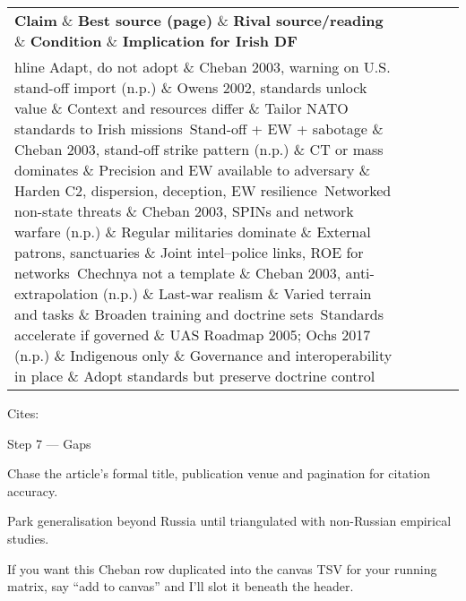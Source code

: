 \begin{tabular}{p{3.2cm}p{4.2cm}p{3.6cm}p{3.2cm}p{4.2cm}}
	\textbf{Claim} \& \textbf{Best source (page)} \& \textbf{Rival source/reading} \& \textbf{Condition} \& \textbf{Implication for Irish DF}\\hline
	Adapt, do not adopt \& Cheban 2003, warning on U.S. stand-off import (n.p.) \& Owens 2002, standards unlock value \& Context and resources differ \& Tailor NATO standards to Irish missions\
	Stand-off + EW + sabotage \& Cheban 2003, stand-off strike pattern (n.p.) \& CT or mass dominates \& Precision and EW available to adversary \& Harden C2, dispersion, deception, EW resilience\
	Networked non-state threats \& Cheban 2003, SPINs and network warfare (n.p.) \& Regular militaries dominate \& External patrons, sanctuaries \& Joint intel–police links, ROE for networks\
	Chechnya not a template \& Cheban 2003, anti-extrapolation (n.p.) \& Last-war realism \& Varied terrain and tasks \& Broaden training and doctrine sets\
	Standards accelerate if governed \& UAS Roadmap 2005; Ochs 2017 (n.p.) \& Indigenous only \& Governance and interoperability in place \& Adopt standards but preserve doctrine control\
\end{tabular}

Cites:

Step 7 — Gaps

Chase the article’s formal title, publication venue and pagination for citation accuracy.

Park generalisation beyond Russia until triangulated with non-Russian empirical studies.

If you want this Cheban row duplicated into the canvas TSV for your running matrix, say “add to canvas” and I’ll slot it beneath the header.

\parencite{CRAFT_2004}
